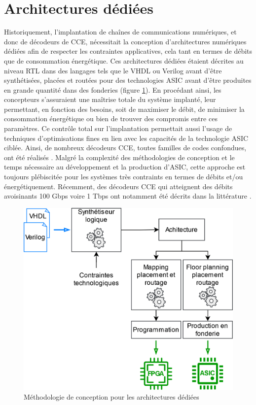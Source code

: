 \documentclass[../main.tex]{subfiles}
\begin{document}
\section{Architectures dédiées}

Historiquement, l’implantation de chaînes de communications numériques, et donc de décodeurs de CCE, nécessitait la conception d’architectures numériques dédiées afin de respecter les contraintes applicatives, cela tant en termes de débits que de consommation énergétique. Ces architectures dédiées étaient décrites au niveau RTL \cite{17} dans des langages tels que le VHDL ou Verilog avant d’être synthétisées, placées et routées pour des technologies ASIC avant d'être produites en grande quantité dans des fonderies (figure \ref{methodo_archi_dediees}). En procédant ainsi, les concepteurs s’assuraient une maîtrise totale du système implanté, leur permettant, en fonction des besoins, soit de maximiser le débit, de minimiser la consommation énergétique ou bien de trouver des compromis entre ces paramètres. Ce contrôle total sur l’implantation permettait aussi l’usage de techniques d’optimisations fines en lien avec les capacités de la technologie ASIC ciblée. Ainsi, de nombreux décodeurs CCE, toutes familles de codes confondues, ont été réalisés \cite{AA1}. Malgré la complexité des méthodologies de conception et le temps nécessaire au développement et la production d’ASIC, cette approche est toujours plébiscitée pour les systèmes très contraints en termes de débits et/ou énergétiquement. Récemment, des décodeurs CCE qui atteignent des débits avoisinants 100 Gbps voire 1 Tbps ont notamment été décrits dans la littérature \cite{AA2, AA3, AA4}.

\begin{figure}
    \centering
    \includegraphics[scale=.13]{figs/methodo_dediee.png}
    \caption{Méthodologie de conception pour les architectures dédiées}
    \label{methodo_archi_dediees}
\end{figure}
\end{document}
